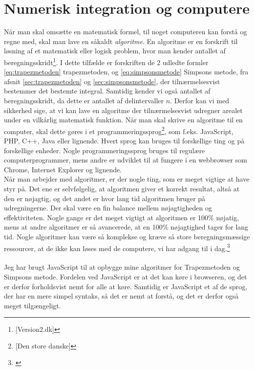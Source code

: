 \documentclass[12pt]{article}
\numberwithin{equation}{section}
\begin{document}
\pagebreak
\section{Numerisk integration og computere}
Når man skal omsætte en matematisk formel, til noget computeren kan forstå og regne med, skal man lave en såkaldt \emph{algoritme}. En algoritme er en forskrift til løsning af et matematisk eller logisk problem, hvor man kender antallet af beregningsskridt\footnote{\cite{version2:algoritme}[Version2.dk]}. I dette tilfælde er forskriften de 2 udledte formler \eqref{eq:trapezmetoden} trapezmetoden, og \eqref{eq:simpsonsmetode} Simpsons metode, fra afsnit \ref{sec:trapezmetoden} og \ref{sec:simpsonsmetode}, der tilnærmelsesvist bestemmer det bestemte integral. Samtidig kender vi også antallet af beregningsskridt, da dette er antallet af delintervaller $n$. Derfor kan vi med sikkerhed sige, at vi kan lave en algoritme der tilnærmelsesvist udregner arealet under en vilkårlig matematisk funktion.
Når man skal skrive en algoritme til en computer, skal dette gøres i et programmeringssprog\footnote{\cite{denstoredanske:algoritme}[Den store danske]}, som f.eks. JavaScript, PHP, C++, Java eller lignende. Hvert sprog kan bruges til forskellige ting og på forskellige enheder. Nogle programmeringssprog bruges til regulære computerprogrammer, mens andre er udviklet til at fungere i en webbrowser som Chrome, Internet Explorer og lignende.
\\
Når man arbejder med algoritmer, er der nogle ting, som er meget vigtige at have styr på. Det ene er selvfølgelig, at algoritmen giver et korrekt resultat, altså at den er nøjagtig, og det andet er hvor lang tid algoritmen bruger på udregningerne. Der skal være en fin balance mellem nøjagtigheden og effektiviteten. Nogle gange er det meget vigtigt at algoritmen er 100\% nøjatig, mens at andre algoritmer er så avancerede, at en 100\% nøjagtighed tager for lang tid. Nogle algoritmer kan være så komplekse og kræve så store beregningsmæssige ressourcer, at de ikke kan løses med de computere, vi har adgang til i dag.\footnote{\cite{version2:algoritme}}
\\\\
Jeg har brugt JavaScript til at opbygge mine algoritmer for Trapezmetoden og Simpsons metode. Fordelen ved JavaScript er at det kan køre i browseren, og det er derfor forholdsvist nemt for alle at køre. Samtidig er JavaScript et af de sprog, der har en mere simpel syntaks, så det er nemt at forstå, og det er derfor også meget tilgængeligt.
\end{document}
